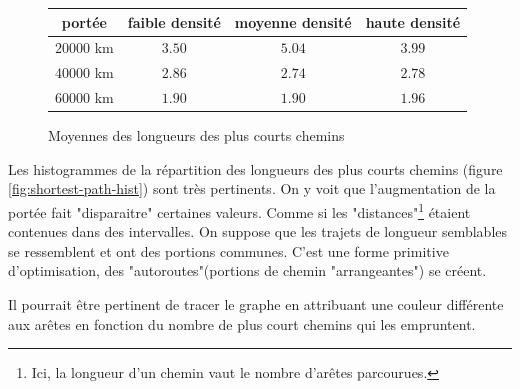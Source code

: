 \documentclass[french]{template}
\begin{document}
\begin{figure}[ht]
    \centering
    \begin{tabular}{|c|c|c|c|}
        \hline
        portée      & faible densité & moyenne densité & haute densité \\
        \hline\hline
        $20 000$ km & $3.50$         & $5.04$          & $3.99$        \\
        \hline
        $40 000$ km & $2.86$         & $2.74$          & $2.78$        \\
        \hline
        $60 000$ km & $1.90$         & $1.90$          & $1.96$        \\
        \hline
    \end{tabular}
    \caption{Moyennes des longueurs des plus courts chemins}
    \label{tab:shortest-path-mean}
\end{figure}

Les histogrammes de la répartition des longueurs des plus courts chemins (figure \ref{fig:shortest-path-hist}) sont très pertinents. On y voit que l'augmentation de la portée fait "disparaitre" certaines valeurs. Comme si les "distances"\footnote{Ici, la longueur d'un chemin vaut le nombre d'arêtes parcourues.} étaient contenues dans des intervalles. On suppose que les trajets de longueur semblables se ressemblent et ont des portions communes. C'est une forme primitive d'optimisation, des "autoroutes"(portions de chemin "arrangeantes") se créent.

Il pourrait être pertinent de tracer le graphe en attribuant une couleur différente aux arêtes en fonction du nombre de plus court chemins qui les empruntent.
\end{document}
